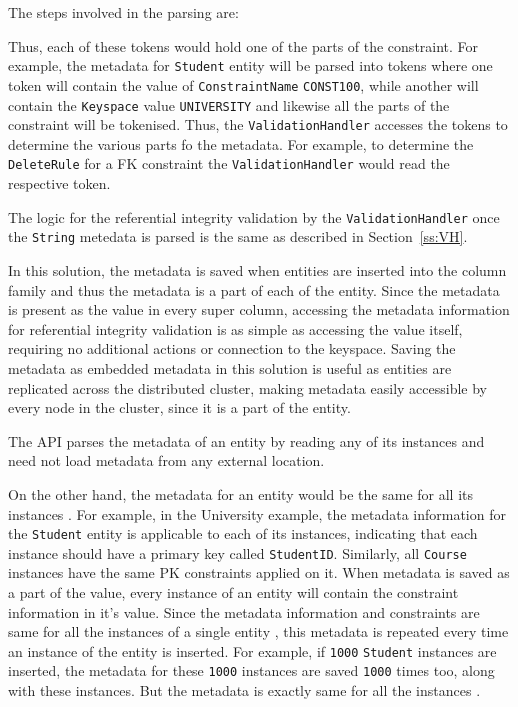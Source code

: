 	The steps involved in the parsing are:
	
	 Thus, each of these tokens would hold one of the parts of the constraint. For example, the metadata for
	\texttt{Student} entity will be parsed into tokens where one token will
	contain the value of \texttt{ConstraintName} \texttt{CONST100}, while another
	will contain the \texttt{Keyspace} value \texttt{UNIVERSITY} and likewise all the
	parts of the constraint will be tokenised. Thus, the \texttt{ValidationHandler} accesses the tokens to determine the various parts fo the metadata. For example, to determine the \texttt{DeleteRule} for a
	\ac{FK} constraint the \texttt{ValidationHandler} would read the respective token.

	The logic for the referential integrity validation by the
	\texttt{ValidationHandler} once the \texttt{String} metedata is parsed is the
	same as described in Section~\ref{ss:VH}.

	In this solution, the metadata is saved  when entities are inserted into the
	column family and thus the metadata is a part of each of the entity.  Since the
	metadata is present as the value in every super column,  accessing the metadata
	information for referential integrity validation is as simple as accessing the
	value itself,  requiring no additional actions or connection to the
	keyspace. Saving the metadata as embedded metadata in this solution is useful
	as entities are replicated across the distributed cluster, making metadata
	easily accessible by every node in the cluster, since it is a part of the
	entity.
	
	The \ac{API} parses the metadata of an entity by reading any of its 
	instances and need not load metadata from any external location.

	On the other hand,  the metadata for an entity would be the same for all its
	instances .  For example,  in the University example,  the metadata
	information for the \texttt{Student} entity is applicable to each of its
	instances,  indicating that each instance  should have a primary key called
	\texttt{StudentID}.
	Similarly,  all \texttt{Course} instances have the same \ac{PK} constraints
	applied on it.  When metadata is saved as a part of the  value,
	every instance of an entity will contain the constraint information
	in it's value.  Since the metadata information and constraints are same for all
	the instances of a single entity ,  this metadata is repeated every time an
	instance of the entity is inserted.  For example,  if
	\texttt{1000} \texttt{Student} instances are inserted,  the metadata for these
	\texttt{1000} instances are saved \texttt{1000} times too, along with these
	instances.  But the metadata is exactly same for all the
	instances .


